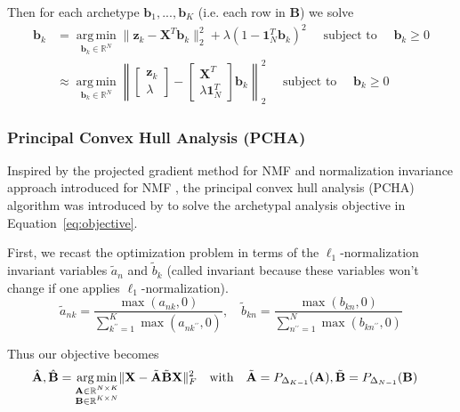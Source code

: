 \documentclass[oneside]{article}
\DeclareMathOperator*{\argmin}{arg\,min}
\begin{document}
Then for each archetype $\mathbf{b}_1, ..., \mathbf{b}_K$ (i.e. each row in $\mathbf{B}$) we solve
\begin{equation}
    \label{eq:rnnls_update_B}
    \begin{aligned}
        \mathbf{b}_k &= \underset{\mathbf{b}_k \in \mathbb{R}^N}{\argmin} \|\mathbf{z}_k - \mathbf{X}^T \mathbf{b}_k\|_2^2 + \lambda \left( 1 - \mathbf{1}_N^T \mathbf{b}_k \right)^2 \quad \text{ subject to } \quad \mathbf{b}_k \geq 0 \\
        &\approx \underset{\mathbf{b}_k \in \mathbb{R}^N}{\argmin} \left\| \begin{bmatrix} \mathbf{z}_k \\ \lambda \end{bmatrix} -  \begin{bmatrix} \mathbf{X}^T \\ \lambda \mathbf{1}_N^T \end{bmatrix} \mathbf{b}_k \right\|_2^2 \quad \text{ subject to } \quad \mathbf{b}_k \geq 0
    \end{aligned}
\end{equation}

\subsubsection{Principal Convex Hull Analysis (PCHA)}

Inspired by the projected gradient method for NMF \autocite{linProjectedGradientMethods2007} and normalization invariance approach introduced for NMF \autocite{eggertSparseCodingNMF2004}, the principal convex hull analysis (PCHA) algorithm was introduced by \autocite{morupArchetypalAnalysisMachine2012} to solve the archetypal analysis objective in Equation~\eqref{eq:objective}.

First, we recast the optimization problem in terms of the $\ell_1$-normalization invariant variables $\tilde{a}_n$ and $\tilde{b}_k$ (called invariant because these variables won't change if one applies $\ell_1$-normalization).
\begin{equation}
\tilde{a}_{nk} = \frac{\max(a_{nk}, 0)}{\sum_{k^{\prime \prime}=1}^K \max(a_{nk^{\prime \prime}}, 0)}, \quad \tilde{b}_{kn} = \frac{\max(b_{kn}, 0)}{\sum_{n^{\prime \prime}=1}^N \max(b_{kn^{\prime \prime}}, 0)}
\end{equation}

Thus our objective becomes
\begin{equation}
\label{eq:objective_pcha}
    \begin{aligned}
        \hat{\mathbf{A}}, \hat{\mathbf{B}} =& \; \underset{\begin{subarray}{c} \mathbf{A} \in \mathbb{R}^{N \times K} \\
        \mathbf{B} \in \mathbb{R}^{K \times N} \end{subarray}}{\argmin} \| \mathbf{X} - \tilde{\mathbf{A}} \tilde{\mathbf{B}} \mathbf{X}\|_F^2 \quad \text{with} \quad \tilde{\mathbf{A}} = P_{\Delta_{K-1}}(\mathbf{A}), \tilde{\mathbf{B}} = P_{\Delta_{N-1}}(\mathbf{B})
    \end{aligned}
\end{equation}
\end{document}
